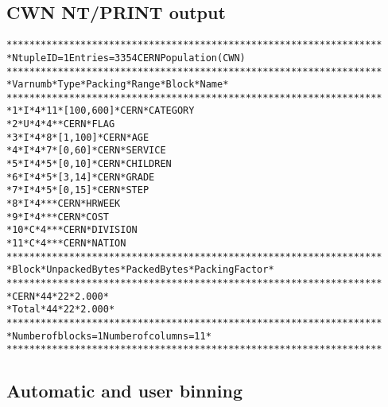 \subsection*{CWN NT/PRINT output}
\begin{alltt}
        ******************************************************************
        * Ntuple ID = 1      Entries = 3354      CERN Population (CWN)
        ******************************************************************
        * Var numb * Type * Packing *    Range     *  Block   *  Name    *
        ******************************************************************
        *      1   * I*4  *    11   * [100,600]    * CERN     * CATEGORY
        *      2   * U*4  *    4    *              * CERN     * FLAG
        *      3   * I*4  *    8    * [1,100]      * CERN     * AGE
        *      4   * I*4  *    7    * [0,60]       * CERN     * SERVICE
        *      5   * I*4  *    5    * [0,10]       * CERN     * CHILDREN
        *      6   * I*4  *    5    * [3,14]       * CERN     * GRADE
        *      7   * I*4  *    5    * [0,15]       * CERN     * STEP
        *      8   * I*4  *         *              * CERN     * HRWEEK
        *      9   * I*4  *         *              * CERN     * COST
        *     10   * C*4  *         *              * CERN     * DIVISION
        *     11   * C*4  *         *              * CERN     * NATION
        ******************************************************************
        *  Block   * Unpacked Bytes * Packed Bytes *   Packing Factor    *
        ******************************************************************
        * CERN     *    44          *    22        *    2.000            *
        * Total    *    44          *    22        *    2.000            *
        ******************************************************************
        * Number of blocks = 1     Number of columns = 11                *
        ******************************************************************
\end{alltt} 

\clearpage

\subsection{Automatic and user binning}
